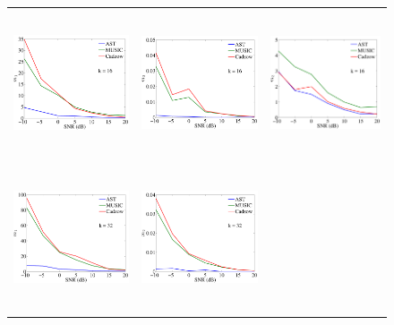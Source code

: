 \begin{figure}[htbp]
\begin{tabular}{ccc}
	\includegraphics[height=43mm]{figures/mSNR1_16.pdf} &
	\includegraphics[height=43mm]{figures/mSNR2_16.pdf} &
	\includegraphics[height=43mm]{figures/mSNR3_16.pdf} \\
	\includegraphics[height=43mm]{figures/mSNR1_32.pdf} &
	\includegraphics[height=43mm]{figures/mSNR2_32.pdf} &

\end{tabular}
\end{figure}
